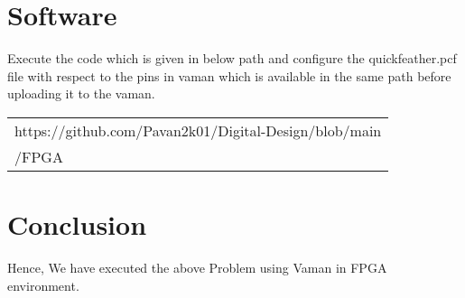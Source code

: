 \documentclass[journal,12pt,twocolumn]{IEEEtran}
\begin{document}
\section{\textbf{Software}}
Execute the code which is given in below path and configure the quickfeather.pcf file with respect to the pins in vaman which is available in the same path before uploading it to the vaman.
\begin{tabularx}{0.45\textwidth}{
                 | >{\centering\arraybackslash}X|}
         \hline                                                                                          https://github.com/Pavan2k01/Digital-Design/blob/main\\                                                    /FPGA\\                                                                               \hline
 \end{tabularx}
 \section{Conclusion}
	Hence, We have executed the above Problem using Vaman in FPGA environment.
\end{document}
